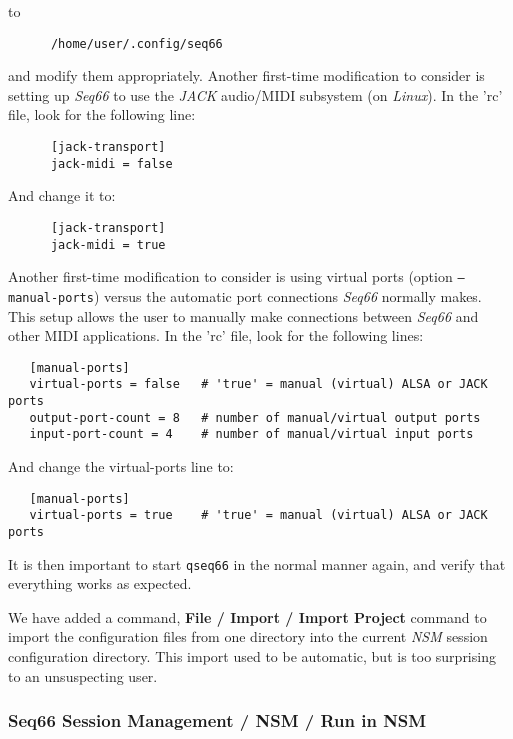    to

   \begin{verbatim}
      /home/user/.config/seq66
   \end{verbatim}

   and modify them appropriately.
   Another first-time modification to consider is setting up \textsl{Seq66} to
   use the \textsl{JACK} audio/MIDI subsystem (on \textsl{Linux}).
   In the 'rc' file, look for the following line:

   \begin{verbatim}
      [jack-transport]
      jack-midi = false
   \end{verbatim}

   And change it to:

   \begin{verbatim}
      [jack-transport]
      jack-midi = true
   \end{verbatim}

   Another first-time modification to consider is using virtual ports (option
   \texttt{--manual-ports}) versus the automatic port connections
   \textsl{Seq66} normally makes.
   This setup allows the user to manually make connections between
   \textsl{Seq66} and other MIDI applications.
   In the 'rc' file, look for the following lines:

\begin{verbatim}
   [manual-ports]
   virtual-ports = false   # 'true' = manual (virtual) ALSA or JACK ports
   output-port-count = 8   # number of manual/virtual output ports
   input-port-count = 4    # number of manual/virtual input ports
\end{verbatim}

   And change the virtual-ports line to:

\begin{verbatim}
   [manual-ports]
   virtual-ports = true    # 'true' = manual (virtual) ALSA or JACK ports
\end{verbatim}

   It is then important to start \texttt{qseq66} in the normal manner again,
   and verify that everything works as expected.

   We have added a command, \textbf{File / Import / Import Project}
   command to import the configuration files from one directory into the
   current \textsl{NSM} session configuration directory.
   This import used to be automatic, but is too surprising to an unsuspecting
   user.

\subsubsection{Seq66 Session Management / NSM / Run in NSM}
\label{subsec:sessions_nsm_first_run_in_nsm}


